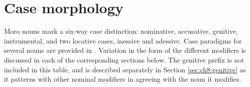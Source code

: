 




%

\section{Case morphology}\label{sec:ch6:case}

Moro nouns mark a six-way case distinction: nominative, accusative, genitive, instrumental, and two locative cases, inessive and adessive. Case paradigms for several nouns are provided in . Variation in the form of the different modifiers is discussed in each of the corresponding sections below. The genitive prefix is not included in this table, and is described separately in Section \ref{sec:ch8:genitive} as it patterns with other nominal modifiers in agreeing with the noun it modifies. %

